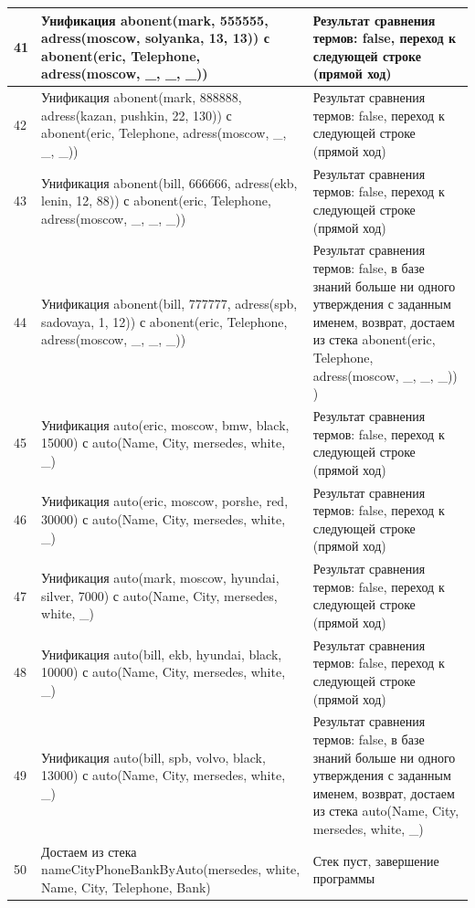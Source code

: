 \documentclass[a4paper,14pt]{extreport} %
\begin{document}
\begin{longtable}{|p{1.1cm}|p{8.5cm}|p{7cm}|}
	41 & Унификация abonent(mark, 555555, adress(moscow, solyanka, 13, 13)) с abonent(eric, Telephone, adress(moscow, \_, \_, \_)) & Результат сравнения термов: false, переход к следующей строке (прямой ход) \\ \hline
	42 & Унификация abonent(mark, 888888, adress(kazan, pushkin, 22, 130)) с abonent(eric, Telephone, adress(moscow, \_, \_, \_)) & Результат сравнения термов: false, переход к следующей строке (прямой ход) \\ \hline
	43 & Унификация abonent(bill, 666666, adress(ekb, lenin, 12, 88)) с abonent(eric, Telephone, adress(moscow, \_, \_, \_)) & Результат сравнения термов: false, переход к следующей строке (прямой ход) \\ \hline
	44 & Унификация abonent(bill, 777777, adress(spb, sadovaya, 1, 12)) с abonent(eric, Telephone, adress(moscow, \_, \_, \_)) & Результат сравнения термов: false, в базе знаний больше ни одного утверждения с заданным именем, возврат, достаем из стека abonent(eric, Telephone, adress(moscow, \_, \_, \_)) ) \\ \hline

	45 & Унификация auto(eric, moscow, bmw, black, 15000) с auto(Name, City, mersedes, white, \_)  & Результат сравнения термов: false, переход к следующей строке (прямой ход) \\ \hline
	46 & Унификация auto(eric, moscow, porshe, red, 30000) с auto(Name, City, mersedes, white, \_)  & Результат сравнения термов: false, переход к следующей строке (прямой ход) \\ \hline
	47 & Унификация auto(mark, moscow, hyundai, silver, 7000) с auto(Name, City, mersedes, white, \_) & Результат сравнения термов: false, переход к следующей строке (прямой ход) \\ \hline
	48 & Унификация auto(bill, ekb, hyundai, black, 10000) с auto(Name, City, mersedes, white, \_)  & Результат сравнения термов: false, переход к следующей строке (прямой ход) \\ \hline
	49 & Унификация auto(bill, spb, volvo, black, 13000) с auto(Name, City, mersedes, white, \_)  & Результат сравнения термов: false, в базе знаний больше ни одного утверждения с заданным именем, возврат, достаем из стека auto(Name, City, mersedes, white, \_)  \\ \hline
	50 & Достаем из стека nameCityPhoneBankByAuto(mersedes, white, Name, City, Telephone, Bank) & Стек пуст, завершение программы \\ \hline
\end{longtable}
\end{document}
